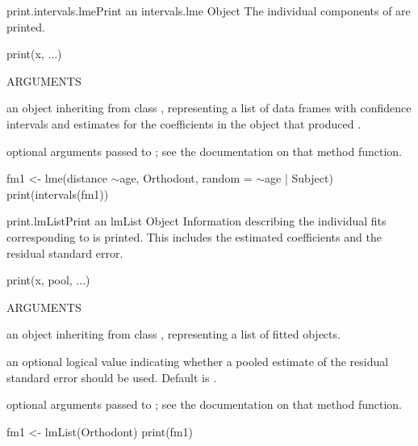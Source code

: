 \documentclass[pdftex]{article} \usepackage{url,graphicx}
\renewcommand{\Twiddle}{\mbox{\(\sim\)}}
\begin{document}
\begin{Helpfile}{print.intervals.lme}{Print an intervals.lme Object}
The individual components of  are printed.
\begin{Example}
print(x, ...)
\end{Example}
\begin{Argument}{ARGUMENTS}
\item[\Co{x:}]
an object inheriting from class ,
representing a list of data frames with confidence intervals and
estimates for the coefficients in the  object that produced
.
\item[\Co{...:}]
optional arguments passed to ; see
the documentation on that method function.
\end{Argument}
\need 15pt
\vspace{-16pt} 
\begin{Example}
fm1 <- lme(distance \Twiddle age, Orthodont, random = \Twiddle age | Subject)
print(intervals(fm1))
\end{Example}
\end{Helpfile}
\begin{Helpfile}{print.lmList}{Print an lmList Object}
Information describing the individual  fits corresponding to
 is printed. This includes the estimated coefficients and
the residual standard error.
\begin{Example}
print(x, pool, ...)
\end{Example}
\begin{Argument}{ARGUMENTS}
\item[\Co{x:}]
an object inheriting from class , representing
a list of fitted  objects.
\item[\Co{pool:}]
an optional logical value indicating whether a pooled
estimate of the residual standard error should be used. Default is
.
\item[\Co{...:}]
optional arguments passed to ; see
the documentation on that method function.
\end{Argument}
\need 15pt
\vspace{-16pt}
\begin{Example}
fm1 <- lmList(Orthodont)
print(fm1)
\end{Example}
\end{Helpfile}
\end{document}
